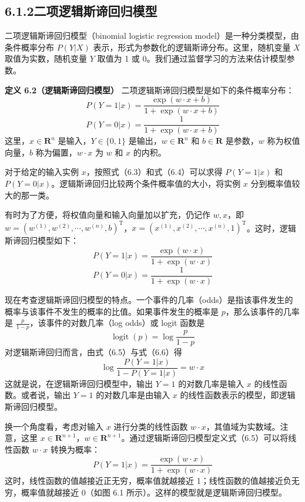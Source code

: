 \documentclass[UTF8,12pt,a4paper,fontset=fandol]{ctexart}
\begin{document}
\subsection*{6.1.2\quad 二项逻辑斯谛回归模型}

二项逻辑斯谛回归模型（binomial logistic regression model）是一种分类模型，由条件概率分布 $P(Y|X)$ 表示，形式为参数化的逻辑斯谛分布。这里，随机变量 $X$ 取值为实数，随机变量 $Y$ 取值为 1 或 0。我们通过监督学习的方法来估计模型参数。

\noindent\textbf{定义 6.2（逻辑斯谛回归模型）}\quad
二项逻辑斯谛回归模型是如下的条件概率分布：
\begin{equation}
P(Y=1|x)=\frac{\exp(w\cdot x+b)}{1+\exp(w\cdot x+b)}
\tag{6.3}
\end{equation}
\begin{equation}
P(Y=0|x)=\frac{1}{1+\exp(w\cdot x+b)}
\tag{6.4}
\end{equation}
这里，$x\in\mathbf{R}^n$ 是输入，$Y\in\{0,1\}$ 是输出，$w\in\mathbf{R}^n$ 和 $b\in\mathbf{R}$ 是参数，$w$ 称为权值向量，$b$ 称为偏置，$w\cdot x$ 为 $w$ 和 $x$ 的内积。

对于给定的输入实例 $x$，按照式（6.3）和式（6.4）可以求得 $P(Y=1|x)$ 和 $P(Y=0|x)$。逻辑斯谛回归比较两个条件概率值的大小，将实例 $x$ 分到概率值较大的那一类。

有时为了方便，将权值向量和输入向量加以扩充，仍记作 $w,x$，即 $w=(w^{(1)},w^{(2)},\cdots,w^{(n)},b)^{\mathrm{T}}$，$x=(x^{(1)},x^{(2)},\cdots,x^{(n)},1)^{\mathrm{T}}$。这时，逻辑斯谛回归模型如下：
\begin{equation}
P(Y=1|x)=\frac{\exp(w\cdot x)}{1+\exp(w\cdot x)}
\tag{6.5}
\end{equation}
\begin{equation}
P(Y=0|x)=\frac{1}{1+\exp(w\cdot x)}
\tag{6.6}
\end{equation}

现在考查逻辑斯谛回归模型的特点。一个事件的几率（odds）是指该事件发生的概率与该事件不发生的概率的比值。如果事件发生的概率是 $p$，那么该事件的几率是 $\frac{p}{1-p}$，该事件的对数几率（log odds）或 logit 函数是
\[
\operatorname{logit}(p)=\log\frac{p}{1-p}
\]
对逻辑斯谛回归而言，由式（6.5）与式（6.6）得
\[
\log\frac{P(Y=1|x)}{1-P(Y=1|x)}=w\cdot x
\]
这就是说，在逻辑斯谛回归模型中，输出 $Y=1$ 的对数几率是输入 $x$ 的线性函数。或者说，输出 $Y=1$ 的对数几率是由输入 $x$ 的线性函数表示的模型，即逻辑斯谛回归模型。

换一个角度看，考虑对输入 $x$ 进行分类的线性函数 $w\cdot x$，其值域为实数域。注意，这里 $x\in\mathbf{R}^{n+1}$，$w\in\mathbf{R}^{n+1}$。通过逻辑斯谛回归模型定义式（6.5）可以将线性函数 $w\cdot x$ 转换为概率：
\[
P(Y=1|x)=\frac{\exp(w\cdot x)}{1+\exp(w\cdot x)}
\]
这时，线性函数的值越接近正无穷，概率值就越接近 1；线性函数的值越接近负无穷，概率值就越接近 0（如图 6.1 所示）。这样的模型就是逻辑斯谛回归模型。
\end{document}
